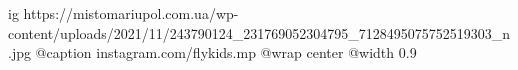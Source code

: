  
 
 
 
 

\ifcmt
  ig https://mistomariupol.com.ua/wp-content/uploads/2021/11/243790124_231769052304795_7128495075752519303_n.jpg
	@caption instagram.com/flykids.mp
  @wrap center
  @width 0.9
\fi
